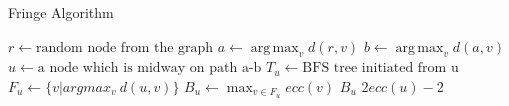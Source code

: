 \documentclass[12pt]{article}
\DeclareMathOperator*{\argmax}{arg\,max}
\begin{document}
\begin{algorithm}[H]
\caption{Fringe Algorithm}\label{fringe}
\begin{algorithmic}
\State $r \gets \text{random node from the graph}$
\State $a \gets \argmax_v d(r, v)$
\State $b \gets \argmax_v d(a, v)$
\State $u \gets \text{a node which is midway on path a-b}$
\State $T_u \gets \text{BFS tree initiated from u}$
\State $F_u \gets \{v | argmax_v ~d(u, v)\}$ 
\State {}
\Else
\State $B_u \gets \max_{v \in F_u} ecc(v)$
\State \Return $B_u$
\Else{$~~$} 
\Return $2ecc(u) - 2$
\EndIf
\EndIf
\EndProcedure
\end{algorithmic}
\end{algorithm}
\end{document}
